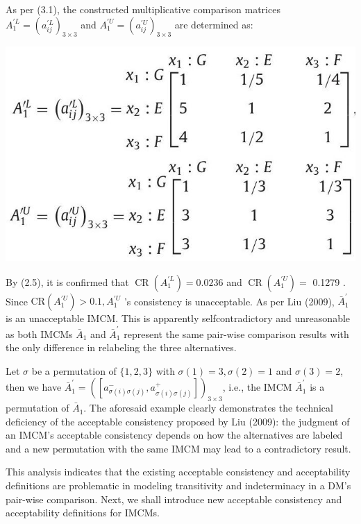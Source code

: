 \documentclass[10pt]{article}
\begin{document}
As per (3.1), the constructed multiplicative comparison matrices $A_{1}^{\prime L}=\left(a_{i j}^{\prime L}\right)_{3 \times 3}$ and $A_{1}^{\prime U}=\left(a_{i j}^{\prime U}\right)_{3 \times 3}$ are determined as:

\begin{center}
\includegraphics[max width=\textwidth]{2024_01_11_2cd5b15325412bfb985dg-03}
\end{center}

By (2.5), it is confirmed that $\operatorname{CR}\left(A_{1}^{\prime L}\right)=0.0236$ and $\operatorname{CR}\left(A_{1}^{\prime U}\right)=$ 0.1279 . Since $\mathrm{CR}\left(A_{1}^{\prime U}\right)>0.1, A_{1}^{\prime U}$ 's consistency is unacceptable. As per Liu (2009), $\bar{A}_{1}^{\prime}$ is an unacceptable IMCM. This is apparently selfcontradictory and unreasonable as both IMCMs $\bar{A}_{1}$ and $\bar{A}_{1}^{\prime}$ represent the same pair-wise comparison results with the only difference in relabeling the three alternatives.

Let $\sigma$ be a permutation of $\{1,2,3\}$ with $\sigma(1)=3, \sigma(2)=1$ and $\sigma(3)=2$, then we have $\bar{A}_{1}^{\prime}=\left(\left[a_{\sigma(i) \sigma(j)}^{-}, a_{\sigma(i) \sigma(j)}^{+}\right]\right)_{3 \times 3}$, i.e., the IMCM $\bar{A}_{1}^{\prime}$ is a permutation of $\bar{A}_{1}$. The aforesaid example clearly demonstrates the technical deficiency of the acceptable consistency proposed by Liu (2009): the judgment of an IMCM's acceptable consistency depends on how the alternatives are labeled and a new permutation with the same IMCM may lead to a contradictory result.

This analysis indicates that the existing acceptable consistency and acceptability definitions are problematic in modeling transitivity and indeterminacy in a DM's pair-wise comparison. Next, we shall introduce new acceptable consistency and acceptability definitions for IMCMs.
\end{document}
